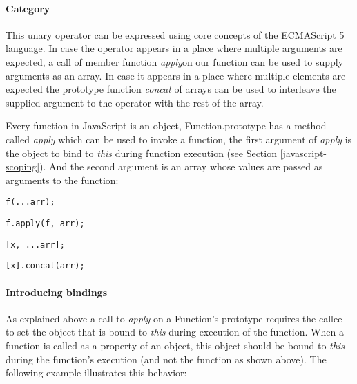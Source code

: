 \paragraph{Category}
This unary operator can be expressed using core concepts of the ECMAScript 5 language. In case the operator appears in a place where multiple arguments are expected, a call of member function \textit{apply}\footnotemark on our function can be used to supply arguments as an array. In case it appears in a place where multiple elements are expected the prototype function \textit{concat} of arrays can be used to interleave the supplied argument to the operator with the rest of the array.


Every function in JavaScript is an object, Function.prototype has a method called \textit{apply} which can be used to invoke a function, the first argument of \textit{apply} is the object to bind to \textit{this} during function execution (see Section \ref{javascript-scoping}). And the second argument is an array whose values are passed as arguments to the function:

\begin{minipage}{0.45\textwidth}
\begin{lstlisting}
f(...arr);
\end{lstlisting}
\end{minipage}
\hfill
\begin{minipage}{0.45\textwidth}
\begin{lstlisting}
f.apply(f, arr);
\end{lstlisting}
\end{minipage}

\begin{minipage}{0.45\textwidth}
\begin{lstlisting}
[x, ...arr];
\end{lstlisting}
\end{minipage}
\hfill
\begin{minipage}{0.45\textwidth}
\begin{lstlisting}
[x].concat(arr);
\end{lstlisting}
\end{minipage}

\paragraph{Introducing bindings} \label{spread-intoducing-bindings}
As explained above a call to \textit{apply} on a Function's prototype requires the callee to set the object that is bound to \textit{this} during execution of the function. When a function is called as a property of an object, this object should be bound to \textit{this} during the function's execution (and not the function as shown above). The following example illustrates this behavior:

